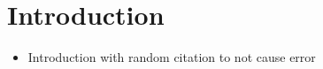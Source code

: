 \chapter{Introduction}
\begin{itemize}
    \item Introduction with random citation to not cause error~\cite{ACR*10}
\end{itemize}

